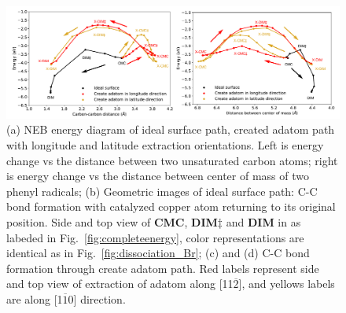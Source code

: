 \documentclass[%
 reprint,
 amsmath,amssymb,
 aps,
prb,
floatfix,
]{revtex4-2}
\newcommand{\comm}{\color{ForestGreen}} %
\begin{document}
\begin{figure}[hbt]
\centering
\includegraphics[width=1.0\textwidth]{Fig/distance-energy.pdf}
\caption{(a) NEB energy diagram of ideal surface path, created adatom path with longitude and latitude extraction orientations. Left is energy change vs the distance between two unsaturated carbon atoms; right is energy change vs the distance between center of mass of two phenyl radicals; (b) Geometric images of ideal surface path: C-C bond formation with catalyzed copper atom returning to its original position. Side and top view of \textbf{CMC}, \textbf{DIM$\ddagger$} and \textbf{DIM} in as labeded in Fig.~\ref{fig:completeenergy}, color representations are identical as in Fig.~\ref{fig:dissociation_Br}; (c) and (d) C-C bond formation through create adatom path. Red labels represent side and top view of extraction of adatom along [11$\overline{2}$], and yellows labels are along [1$\overline{1}$0] direction. 
}
\label{fig:distance-energy}
\end{figure}
\end{document}
